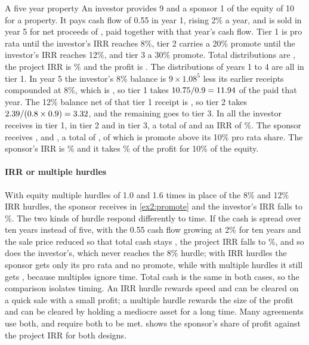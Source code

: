 \begin{chapterrefs}
\begin{example}{A five year property}\label{ex2:promote}
An investor provides 9 and a sponsor 1 of the equity of 10 for a property. It pays cash flow of 0.55 in
year 1, rising 2\% a year, and is sold in year 5 for net proceeds of \reP, paid together with that year's cash flow. Tier 1 is pro rata until
the investor's IRR reaches 8\%, tier 2 carries a 20\% promote until the investor's IRR reaches 12\%, and
tier 3 a 30\% promote. Total distributions are \reDist, the project IRR is \reProjIrr\% and the profit is
\reProfit. The distributions of years 1 to 4 are all in tier 1. In year 5 the investor's 8\% balance is
$9\times1.08^5$ less its earlier receipts compounded at 8\%, which is \reBalOne, so tier 1 takes
$10.75/0.9 = 11.94$ of the \reYrFive{} paid that year. The 12\% balance net of that tier 1
receipt is \reBalTwo, so tier 2 takes $2.39/(0.8\times0.9) = 3.32$, and the remaining
\reTierThreeSize{} goes to tier 3. In all the investor receives \reTierOneInv{} in tier 1, \reTierTwoInv{} in tier 2 and \reTierThreeInv{}
in tier 3, a total of \reInvTot{} and an IRR of \reInvIrr\%. The sponsor receives \reTierOneSpo,
\reTierTwoSpo{} and \reTierThreeSpo, a total of \reSpoTot, of which \rePromote{} is promote above its 10\%
pro rata share. The sponsor's IRR is \reSpoIrr\% and it takes \reSpoShareProfit\% of the profit for 10\%
of the equity.
\end{example}

\paragraph{IRR or multiple hurdles}
With equity multiple hurdles of 1.0 and 1.6 times in place of the 8\% and 12\% IRR hurdles, the sponsor
receives \reMulSpoTot{} in \cref{ex2:promote} and the investor's IRR falls to \reMulInvIrr\%. The two
kinds of hurdle respond differently to time. If the cash is spread over ten years instead of five, with the 0.55
cash flow growing at 2\% for ten years and the sale price reduced so that total cash stays \reDist, the project IRR falls to \reTenIrr\%, and so does the investor's, which never reaches the 8\% hurdle; with
IRR hurdles the sponsor gets only its pro rata \reTenSpoIrrTiers{} and no promote, while with multiple
hurdles it still gets \reTenSpoMulTiers, because multiples ignore time. Total cash is the same in both cases, so the comparison isolates timing. An IRR hurdle rewards
speed and can be cleared on a quick sale with a small profit; a multiple hurdle rewards the size of the
profit and can be cleared by holding a mediocre asset for a long time. Many agreements use both, and
require both to be met.  shows the sponsor's share of profit against the project IRR
for both designs.


\end{chapterrefs}
